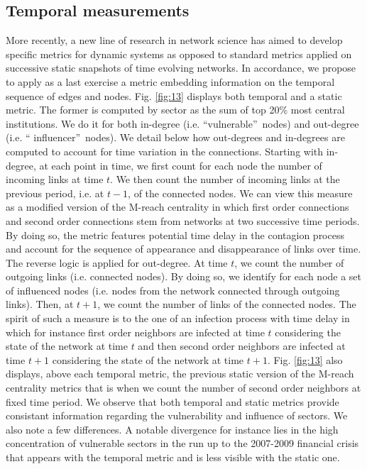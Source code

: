 \documentclass[a4paper,10pt]{article}
\begin{document}
 \subsection{Temporal measurements}
 More recently, a new line of research in network science has aimed to develop specific metrics for dynamic systems as opposed
 to standard metrics applied on successive static snapshots of time evolving networks. In accordance, we propose  to apply as
 a last exercise a metric embedding information on the temporal sequence of edges and nodes. Fig. \ref{fig:13} displays both 
 temporal and a static metric. The former is computed by sector as the sum of top 20\% most central institutions. We do it for
 both in-degree (i.e. \textquotedblleft vulnerable\textquotedblright\ nodes) and out-degree (i.e. \textquotedblleft 
 influencer\textquotedblright\ nodes).  We detail below how out-degrees and in-degrees are computed to account for time 
 variation in the connections. Starting with in-degree, at each point in time, we first count for each node the number of 
 incoming links at time $t$. We then count the number of incoming links at the previous period, i.e. at $t-1$, of the 
 connected nodes. We can view this measure as a modified version of the M-reach centrality in which  first order connections
 and second order connections stem from networks at two successive time periods. By doing so, the metric features potential 
 time delay in the contagion process and account for the sequence of appearance and disappearance of links over time. The 
 reverse logic is applied for out-degree. At time $t$, we count the number of outgoing links (i.e. connected nodes). By doing 
 so, we identify for each node a set of influenced nodes (i.e. nodes from the network connected through outgoing links). Then,
 at $t+1$, we count the number of links of the connected nodes. The spirit of such a measure is to the one of an infection
 process with time delay in which for instance first order neighbors are infected  at time $t$ considering the state of the 
 network at time $t$ and then second order neighbors are infected at time $t+1$ considering the state of the network at time 
 $t+1$. Fig. \ref{fig:13} also displays, above each temporal metric, the previous static version of the M-reach centrality
 metrics that is when we count the number of second order neighbors at fixed time period.  We observe that both temporal and 
 static metrics provide consistant information regarding the vulnerability and influence of sectors. We also note a
 few differences. A notable divergence for instance lies in the high concentration of vulnerable sectors in the run up to 
 the 2007-2009 financial crisis that appears with the temporal metric and is less visible with the static one. 
\end{document}
